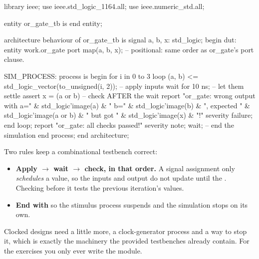 \begin{vhdlcode}
library ieee;
use ieee.std_logic_1164.all;
use ieee.numeric_std.all;

entity or_gate_tb is
end entity;

architecture behaviour of or_gate_tb is
signal a, b, x: std_logic;
begin
    dut: entity work.or_gate
        port map(a, b, x);   -- positional: same order as or_gate's port clause.

    SIM_PROCESS: process is
    begin
        for i in 0 to 3 loop
            (a, b) <= std_logic_vector(to_unsigned(i, 2)); -- apply inputs
            wait for 10 ns;                                -- let them settle
            assert x = (a or b)                            -- check AFTER the wait
                report "or_gate: wrong output with a=" & std_logic'image(a)
                     & " b=" & std_logic'image(b)
                     & ", expected " & std_logic'image(a or b)
                     & " but got " & std_logic'image(x) & "!"
                severity failure;
        end loop;
        report "or_gate: all checks passed!" severity note;
        wait;                                              -- end the simulation
    end process;
end architecture;
\end{vhdlcode}

\noindent Two rules keep a combinational testbench correct:
\begin{itemize}
  \item \textbf{Apply $\to$ wait $\to$ check, in that order.} A signal assignment only
    \emph{schedules} a value, so the inputs and output do not update until the .
    Checking before it tests the previous iteration's values.
  \item \textbf{End with } so the stimulus process suspends and the simulation stops on
    its own.
\end{itemize}
Clocked designs need a little more, a clock-generator process and a way to stop it, which is exactly
the machinery the provided testbenches already contain. For the exercises you only ever write the
module.
